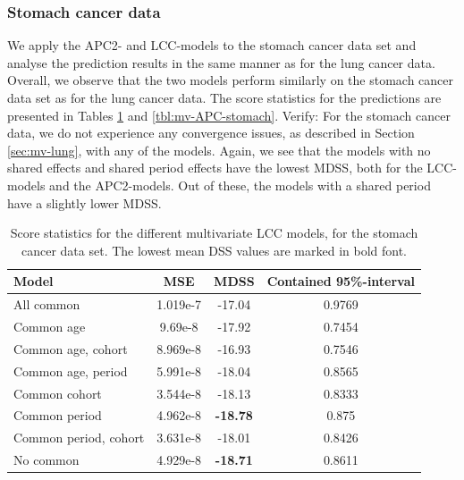 \newpage
\subsubsection{Stomach cancer data}
We apply the APC2- and LCC-models to the stomach cancer data set and analyse the prediction results in the same manner as for the lung cancer data. Overall, we observe that the two models perform similarly on the stomach cancer data set as for the lung cancer data. The score statistics for the predictions are presented in Tables \ref{tbl:mv-LCC-stomach} and \ref{tbl:mv-APC-stomach}. \textcolor{myDarkGreen}{Verify: For the stomach cancer data, we do not experience any convergence issues, as described in Section \ref{sec:mv-lung}, with any of the models.} Again, we see that the models with no shared effects and shared period effects have the lowest MDSS, both for the LCC-models and the APC2-models. Out of these, the models with a shared period have a slightly lower MDSS.  

\begin{table}
    \begin{center}
        \begin{tabular}{l |c c c }
            Model & MSE & MDSS & Contained 95\%-interval\\
            \hline
            All common            & 1.019e-7  & -17.04    & 0.9769 \\
            Common age            &  9.69e-8 & -17.92    & 0.7454 \\
            Common age, cohort    & 8.969e-8 & -16.93    & 0.7546 \\
            Common age, period    & 5.991e-8 & -18.04    & 0.8565 \\
            Common cohort         &  3.544e-8 & -18.13   & 0.8333 \\
            Common period         &  4.962e-8 & \textbf{-18.78}   & 0.875  \\
            Common period, cohort & 3.631e-8 & -18.01    & 0.8426 \\
            No common            &  4.929e-8 & \textbf{-18.71}    & 0.8611 \\
        \end{tabular}
        \caption{Score statistics for the different multivariate LCC models, for the stomach cancer data set. The lowest mean DSS values are marked in bold font. }\label{tbl:mv-LCC-stomach}
    \end{center}
\end{table}

